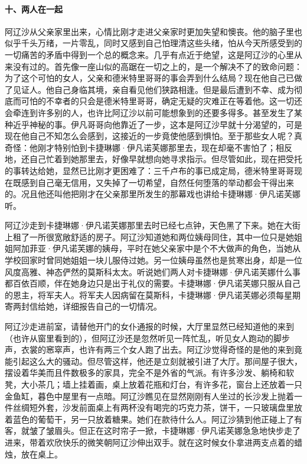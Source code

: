 \paragraph*{十、两人在一起}
\par 阿辽沙从父亲家里出来，心情比刚才走进父亲家时更加失望和懊丧。他的脑子里也似乎千头万绪，一片零乱，同时又感到自己怕理清这些头绪，怕从今天所感受到的一切痛苦的矛盾中得到一个总的概念来。几乎有点近于绝望，这是阿辽沙的心里从来没有过的。首先像一座山似的高踞在一切之上的，是一个解决不了的致命问题：为了这个可怕的女人，父亲和德米特里哥哥的事会弄到什么结局？现在他自己已做了见证人。他自己身临其境，亲自看见他们狭路相逢。但是最后遭到不幸、成为彻底而可怕的不幸者的只会是德米特里哥哥，确定无疑的灾难正在等着他。这一切还会牵连到许多别的人，也许比阿辽沙以前可能想象到的还要多得多。甚至发生了某种近乎神秘的事。伊凡哥哥向他靠近了一步，这本是阿辽沙早就十分渴望的，可是现在他自己不知怎么会感到，这接近的一步竟使他感到惧怕。至于那些女人呢？真奇怪：他刚才特别怕到卡捷琳娜·伊凡诺芙娜那里去，现在却毫不害怕了；相反地，还自己忙着到她那里去，好像早就想向她寻求指示。但尽管如此，现在把受托的事转达给她，显然已比刚才更困难了：三千卢布的事已成定局，德米特里哥哥现在既感到自己毫无信用，又失掉了一切希望，自然任何堕落的举动都会干得出来的。况且他还叫他把刚才在父亲那里所发生的那幕戏也讲给卡捷琳娜·伊凡诺芙娜听。
\par 阿辽沙走到卡捷琳娜·伊凡诺芙娜那里去时已经七点钟，天色黑了下来。她在大街上租了一所很宽敞舒适的房子。阿辽沙知道她和两位姨母同住，其中一位只是她姐姐阿加菲亚·伊凡诺芙娜的姨母，平时在她父亲家中是个不大做声的角色，当她从学校回家时曾同她姐姐一块儿服侍过她。另一位姨母虽然也是贫寒出身，却是一位风度高雅、神态俨然的莫斯科太太。听说她们两人对卡捷琳娜·伊凡诺芙娜什么事都百依百顺，伴在她身边只是出于礼仪的需要。卡捷琳娜·伊凡诺芙娜只服从自己的恩主，将军夫人。将军夫人因病留在莫斯科，卡捷琳娜·伊凡诺芙娜必须每星期寄两封信给她，详细报告自己的一切情况。
\par 阿辽沙走进前室，请替他开门的女仆通报的时候，大厅里显然已经知道他的来到（也许从窗里看到的），但阿辽沙还是忽然听见一阵忙乱，听见女人跑动的脚步声，衣裳的窸窣声，也许有两三个女人跑了出去。阿辽沙觉得奇怪的是他的来到竟能引起这么大的骚动。但尽管这样，他还是立刻就被引进了大厅。那间屋子很大，摆设着华美而且件数极多的家具，完全不是外省的气派。有许多沙发、躺椅和软凳，大小茶几；墙上挂着画，桌上放着花瓶和灯台，有许多花，窗台上还放着一只金鱼缸，暮色中屋里有一点暗。阿辽沙瞧见在显然刚刚有人坐过的长沙发上抛着一件丝绸短外套，沙发前面桌上有两杯没有喝完的巧克力茶，饼干，一只玻璃盘里放着蓝色的葡萄干，另一只放着糖果。她们在款待什么人。阿辽沙猜到他正碰上了有客，就皱了皱眉头。但正在这时帘子一掀，卡捷琳娜·伊凡诺芙娜急急地快步走了进来，带着欢欣快乐的微笑朝阿辽沙伸出双手。就在这时候女仆拿进两支点着的蜡烛，放在桌上。
